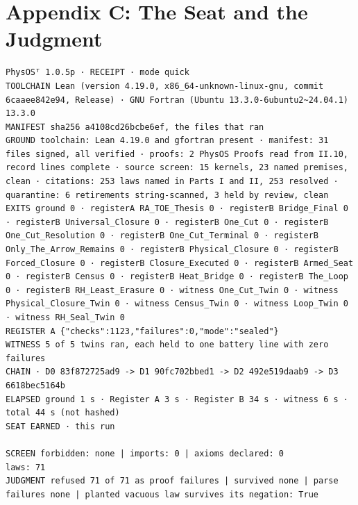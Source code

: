 \documentclass[10pt]{article}
\begin{document}
\hypertarget{appendix-c-the-seat-and-the-judgment}{%
\section{Appendix C: The Seat and the
Judgment}\label{appendix-c-the-seat-and-the-judgment}}

\begin{Verbatim}[fontsize=\fontsize{6.0}{7.0}\selectfont,breaklines,breakanywhere,breaksymbolleft={}]
PhysOSᵀ 1.0.5p · RECEIPT · mode quick
TOOLCHAIN Lean (version 4.19.0, x86_64-unknown-linux-gnu, commit 6caaee842e94, Release) · GNU Fortran (Ubuntu 13.3.0-6ubuntu2~24.04.1) 13.3.0
MANIFEST sha256 a4108cd26bcbe6ef, the files that ran
GROUND toolchain: Lean 4.19.0 and gfortran present · manifest: 31 files signed, all verified · proofs: 2 PhysOS Proofs read from II.10, record lines complete · source screen: 15 kernels, 23 named premises, clean · citations: 253 laws named in Parts I and II, 253 resolved · quarantine: 6 retirements string-scanned, 3 held by review, clean
EXITS ground 0 · registerA RA_TOE_Thesis 0 · registerB Bridge_Final 0 · registerB Universal_Closure 0 · registerB One_Cut 0 · registerB One_Cut_Resolution 0 · registerB One_Cut_Terminal 0 · registerB Only_The_Arrow_Remains 0 · registerB Physical_Closure 0 · registerB Forced_Closure 0 · registerB Closure_Executed 0 · registerB Armed_Seat 0 · registerB Census 0 · registerB Heat_Bridge 0 · registerB The_Loop 0 · registerB RH_Least_Erasure 0 · witness One_Cut_Twin 0 · witness Physical_Closure_Twin 0 · witness Census_Twin 0 · witness Loop_Twin 0 · witness RH_Seal_Twin 0
REGISTER A {"checks":1123,"failures":0,"mode":"sealed"}
WITNESS 5 of 5 twins ran, each held to one battery line with zero failures
CHAIN · D0 83f872725ad9 -> D1 90fc702bbed1 -> D2 492e519daab9 -> D3 6618bec5164b
ELAPSED ground 1 s · Register A 3 s · Register B 34 s · witness 6 s · total 44 s (not hashed)
SEAT EARNED · this run

SCREEN forbidden: none | imports: 0 | axioms declared: 0
laws: 71
JUDGMENT refused 71 of 71 as proof failures | survived none | parse failures none | planted vacuous law survives its negation: True
\end{Verbatim}
\end{document}
